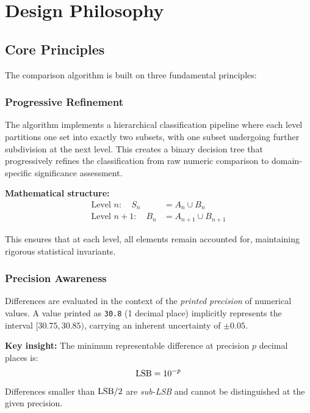 \section{Design Philosophy}
\label{sec:design}

\subsection{Core Principles}

The \ubdiff{} comparison algorithm is built on three fundamental principles:

\subsubsection{Progressive Refinement}

The algorithm implements a hierarchical classification pipeline where each level partitions one set into exactly two subsets, with one subset undergoing further subdivision at the next level. This creates a binary decision tree that progressively refines the classification from raw numeric comparison to domain-specific significance assessment.

\textbf{Mathematical structure:}
\begin{align*}
    \text{Level } n: \quad S_n &= A_n \cup B_n \\
    \text{Level } n+1: \quad B_n &= A_{n+1} \cup B_{n+1}
\end{align*}

This ensures that at each level, all elements remain accounted for, maintaining rigorous statistical invariants.

\subsubsection{Precision Awareness}

Differences are evaluated in the context of the \emph{printed precision} of numerical values. A value printed as \texttt{30.8} (1 decimal place) implicitly represents the interval $[30.75, 30.85)$, carrying an inherent uncertainty of $\pm 0.05$.

\textbf{Key insight:} The minimum representable difference at precision $p$ decimal places is:
\begin{equation}
    \mathrm{LSB} = 10^{-p}
\end{equation}

Differences smaller than $\mathrm{LSB}/2$ are \emph{sub-LSB} and cannot be distinguished at the given precision.

